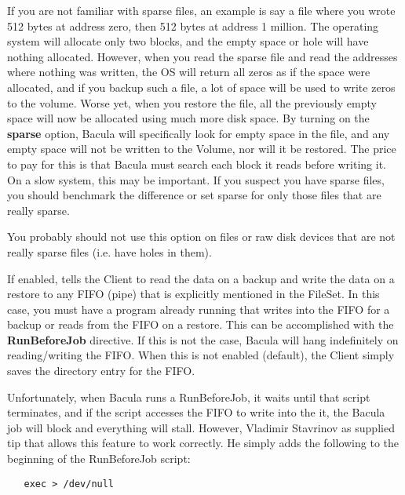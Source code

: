 \begin{description}
   If you are not familiar with sparse files, an example is say a file
   where you wrote 512 bytes at address zero, then 512 bytes at address 1
   million.  The operating system will allocate only two blocks, and the
   empty space or hole will have nothing allocated.  However, when you read
   the sparse file and read the addresses where nothing was written, the OS
   will return all zeros as if the space were allocated, and if you backup
   such a file, a lot of space will be used to write zeros to the volume.
   Worse yet, when you restore the file, all the previously empty space
   will now be allocated using much more disk space.  By turning on the
   {\bf sparse} option, Bacula will specifically look for empty space in
   the file, and any empty space will not be written to the Volume, nor
   will it be restored.  The price to pay for this is that Bacula must
   search each block it reads before writing it.  On a slow system, this
   may be important.  If you suspect you have sparse files, you should
   benchmark the difference or set sparse for only those files that are
   really sparse.

   You probably should not use this option on files or raw disk devices
   that are not really sparse files (i.e. have holes in them).

\label{readfifo}
\item [readfifo=yes\vb{}no]
   If enabled, tells the Client to read the data on a backup and write the
   data on a restore to any FIFO (pipe) that is explicitly mentioned in the
   FileSet.  In this case, you must have a program already running that
   writes into the FIFO for a backup or reads from the FIFO on a restore.
   This can be accomplished with the {\bf RunBeforeJob} directive.  If this
   is not the case, Bacula will hang indefinitely on reading/writing the
   FIFO. When this is not enabled (default), the Client simply saves the
   directory entry for the FIFO.

   Unfortunately, when Bacula runs a RunBeforeJob, it waits until that
   script terminates, and if the script accesses the FIFO to write   
   into the it, the Bacula job will block and everything will stall.
   However, Vladimir Stavrinov as supplied tip that allows this feature   
   to work correctly.  He simply adds the following to the beginning
   of the RunBeforeJob script:

\begin{verbatim}
   exec > /dev/null
\end{verbatim}


\end{description}
